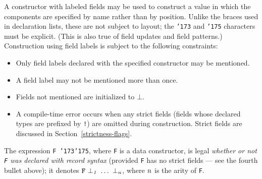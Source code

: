 A constructor with labeled fields may be used to construct a value 
in which the components are specified by name rather than by position.
Unlike the braces used in declaration lists, these are not subject to
layout; the \mbox{\tt {\char'173}} and \mbox{\tt {\char'175}} characters must be explicit.  (This is also
true of field updates and field patterns.)
Construction using field labels is subject to the following constraints:
\begin{itemize}
\item Only field labels declared with the specified constructor may be
mentioned. 
\item A field label may not be mentioned more than once.
\item Fields not mentioned are initialized to $\bot$.
\item A compile-time error occurs when any strict fields (fields
whose declared types are prefixed by \mbox{\tt !}) are omitted during
construction.  Strict fields are discussed in Section~\ref{strictness-flags}.
\end{itemize}
The expression \mbox{\tt F\ {\char'173}{\char'175}}, where \mbox{\tt F} is a data constructor, is legal 
{\em whether or not \mbox{\tt F} was declared with record syntax} (provided \mbox{\tt F} has no strict
fields --- see the fourth bullet above); 
it denotes \mbox{$\it \makebox{\tt F}\ \bot_1\ \ldots \ \bot_n$}, where \mbox{$\it n$} is the arity of \mbox{\tt F}.



